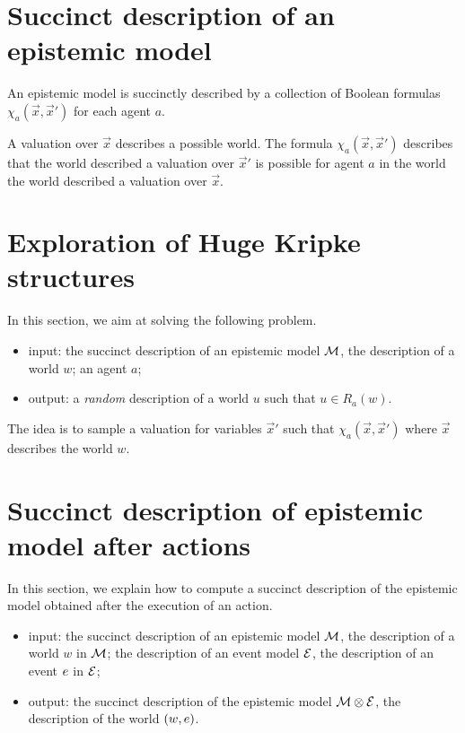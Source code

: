 \documentclass{article}
\begin{document}

\section{Succinct description of an epistemic model}

\begin{definition}
An epistemic model is succinctly described by a collection of Boolean formulas $\chi_a(\vec x, \vec x')$ for each agent $a$.
\end{definition}

A valuation over $\vec x$ describes a possible world. The formula $\chi_a(\vec x, \vec x')$ describes that the world described a valuation over $\vec x'$ is possible for agent $a$ in the world  the world described a valuation over $\vec x$. 


\section{Exploration of Huge Kripke structures}


In this section, we aim at solving the following problem.

\begin{itemize}
	\item input: the succinct description of an epistemic model $\mathcal M$, the description of a world $w$; an agent $a$;
	\item output: a \emph{random} description of a world $u$ such that $u \in R_a(w)$.
\end{itemize}

The idea is to sample a valuation for variables $\vec x'$ such that $\chi_a(\vec x, \vec x')$ where $\vec x$ describes the world $w$.



\section{Succinct description of epistemic model after actions}

In this section, we explain how to compute a succinct description of the epistemic model obtained after the execution of an action. 

\begin{itemize}
	\item input: the succinct description of an epistemic model $\mathcal M$, the description of a world $w$ in $\mathcal M$; the description of an event model $\mathcal E$, the description of an event $e$ in $\mathcal E$;
	\item output: the succinct description of the epistemic model $\mathcal M \otimes \mathcal E$, the description of the world $(w, e)$.
\end{itemize}
\end{document}
